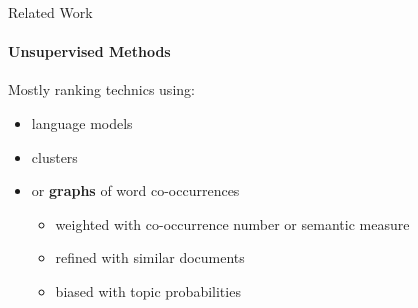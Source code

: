   \begin{frame}{Related Work}
    \framesubtitle{Unsupervised Methods}

    Mostly ranking technics using:
    \begin{itemize}
      \item{language models}
      \item<2->{clusters}
      \item<3->{or \textbf{graphs} of word
                co-occurrences}
      \begin{itemize}
        \item<4->{weighted with co-occurrence number or semantic measure}
        \item<5->{refined with similar documents}
        \item<6->{biased with topic probabilities}
      \end{itemize}
    \end{itemize}
    \vfill
  \end{frame}

